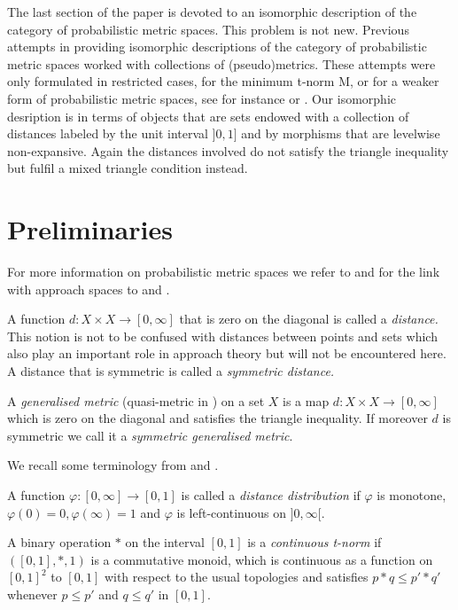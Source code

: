 \documentclass[12pt,a4paper]{amsart}
\theoremstyle{theorem}
\theoremstyle{definition}
\def\rw{\rightarrow}
\begin{document}
{The last section of the paper is devoted to an isomorphic description of the category of probabilistic metric spaces. This problem is not new. Previous attempts in providing isomorphic descriptions of the category of probabilistic metric spaces worked with collections of (pseudo)metrics. These attempts were only formulated in restricted cases, for the minimum t-norm M, or for a weaker form of probabilistic metric spaces, see for instance \cite{N} or \cite{SS}. Our isomorphic desription is in terms of objects that are sets endowed with a collection of distances labeled by the unit interval $]0,1]$ and by morphisms that are levelwise non-expansive. Again the distances involved do not satisfy the triangle inequality but fulfil a mixed triangle condition instead.




   


\section{Preliminaries}


For more information on probabilistic metric spaces we refer to \cite{SS} and for the link with approach spaces to \cite{LSY} and \cite{CL}.

A function $d: X \times X \rw [0, \infty]$  that is zero on the diagonal  is called a \emph{distance.} This notion is not to be confused with distances between points and sets which also play an important role in approach theory but will not be encountered here. A distance that is symmetric is called a \emph{symmetric distance.}

A \emph{generalised metric} (quasi-metric in \cite{LOW}) on a set $X$ is a map $d: X \times X \rw [0, \infty]$ which is zero on the diagonal and satisfies the triangle inequality. If moreover $d$ is symmetric we call it a \emph{symmetric generalised metric}. 




We recall some terminology from \cite{SS} and \cite{LSY}. 

A function $\varphi: [0,\infty] \rw [0,1]$ is called a \emph{distance distribution} if $\varphi$ is monotone,  $\varphi(0) = 0, \varphi(\infty) =1$ and $\varphi$ is left-continuous on $]0,\infty[$.

A binary operation $*$ on the interval $[0,1]$ is a \emph{continuous t-norm} if $([0,1], *, 1)$ is a commutative monoid, which is continuous as a function on $[0,1]^2$ to $[0,1]$ with respect to the usual topologies and satisfies $p * q \leq p' * q'$ whenever $p \leq p'$ and $q \leq q'$ in $[0,1].$


}
\end{document}
